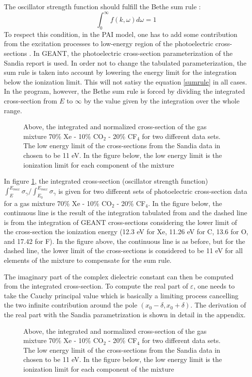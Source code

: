 The oscillator strength function should
fulfill the Bethe sum rule \cite{bib-BETH}:
\begin{equation}
\int_0^{\infty} f(k,\omega) d\omega = 1
\label{sumrule}
\end{equation}
To respect this condition, in the PAI model, one has to add some
contribution from the excitation processes to low-energy region
of the photoelectric cross-sections \cite{bib-ALLIS}. In {\sc GEANT}, the
photoelectric cross-section
parameterization of the Sandia \cite{bib-SANDIA} report is used.
In order not to change the tabulated parameterization, the sum
rule is taken into account by lowering the energy
limit for the integration below the ionization limit.
This will not satisy the equation \ref{sumrule} in all cases.
In the program, however, the Bethe sum rule is forced by
dividing the integrated cross-section from $E$ to $\infty$
by the value given by the integration over the whole range.
\begin{figure}[t]
   \centering
   \caption{Above, the integrated and normalized cross-section
    of the gas mixture 70\% Xe - 10\% CO$_2$ - 20\% CF$_4$
    for two different data sets. The low energy limit
    of the cross-sections from the Sandia data in chosen
    to be 11 eV. In the figure below, the low energy limit
    is the ionization limit for each component of the mixture}
    \label{fosc}
\end{figure}
In figure \ref{fosc}, the integrated cross-section (oscillator
strength function)
$\int_{E}^{E_{max}} \sigma_{\gamma} / \int_{E_0}^{E_{max}} \sigma_{\gamma}$
is given for two different sets of photoelectric cross-section
data for a gas mixture 70\% Xe - 10\% CO$_2$ - 20\% CF$_4$.
In the figure below, the continuous line is the result of the
integration tabulated from \cite{bib-ATOM1} \cite{bib-ATOM2} \cite{bib-ATOM3} 
and the dashed line
is from the integration of {\sc GEANT} cross-sections
considering the lower limit of the cross-section the ionization
energy (12.3 eV for Xe, 11.26 eV for C, 13.6 for O, and
17.42 for F).
In the figure above, the continuous line is as before, but for
the dashed line, the lower limit of the cross-sections is
considered to be 11 eV for all elements of the mixture
to compensate for the sum rule.

The imaginary part of the complex dielectric constant can then
be computed from the integrated cross-section.
To compute the real part of $\varepsilon$, one needs to take the
Cauchy principal value which is basically a limiting process
cancelling the two infinite contribution around the pole
$(x_0-\delta,x_0+\delta)$. The derivation of the real part
with the Sandia parametrization is shown in detail
in the appendix.
\begin{figure}[t]
   \centering
   \caption{Above, the integrated and normalized cross-section
    of the gas mixture 70\% Xe - 10\% CO$_2$ - 20\% CF$_4$
    for two different data sets. The low energy limit
    of the cross-sections from the Sandia data in chosen
    to be 11 eV. In the figure below, the low energy limit
    is the ionization limit for each component of the mixture}
    \label{idndx}
\end{figure}


